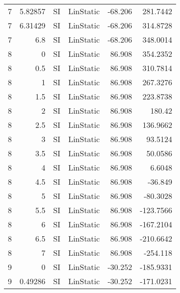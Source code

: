 \begin{table}[H]
{\begin{tabular}{rrrlrr}
    \multicolumn{1}{l}{7} & 5.82857 & \multicolumn{1}{l}{SI} & LinStatic & -68.206 & 281.7442 \\
    \multicolumn{1}{l}{7} & 6.31429 & \multicolumn{1}{l}{SI} & LinStatic & -68.206 & 314.8728 \\
    \multicolumn{1}{l}{7} & 6.8 & \multicolumn{1}{l}{SI} & LinStatic & -68.206 & 348.0014 \\
    \multicolumn{1}{l}{8} & 0   & \multicolumn{1}{l}{SI} & LinStatic & 86.908 & 354.2352 \\
    \multicolumn{1}{l}{8} & 0.5 & \multicolumn{1}{l}{SI} & LinStatic & 86.908 & 310.7814 \\
    \multicolumn{1}{l}{8} & 1   & \multicolumn{1}{l}{SI} & LinStatic & 86.908 & 267.3276 \\
    \multicolumn{1}{l}{8} & 1.5 & \multicolumn{1}{l}{SI} & LinStatic & 86.908 & 223.8738 \\
    \multicolumn{1}{l}{8} & 2   & \multicolumn{1}{l}{SI} & LinStatic & 86.908 & 180.42 \\
    \multicolumn{1}{l}{8} & 2.5 & \multicolumn{1}{l}{SI} & LinStatic & 86.908 & 136.9662 \\
    \multicolumn{1}{l}{8} & 3   & \multicolumn{1}{l}{SI} & LinStatic & 86.908 & 93.5124 \\
    \multicolumn{1}{l}{8} & 3.5 & \multicolumn{1}{l}{SI} & LinStatic & 86.908 & 50.0586 \\
    \multicolumn{1}{l}{8} & 4   & \multicolumn{1}{l}{SI} & LinStatic & 86.908 & 6.6048 \\
    \multicolumn{1}{l}{8} & 4.5 & \multicolumn{1}{l}{SI} & LinStatic & 86.908 & -36.849 \\
    \multicolumn{1}{l}{8} & 5   & \multicolumn{1}{l}{SI} & LinStatic & 86.908 & -80.3028 \\
    \multicolumn{1}{l}{8} & 5.5 & \multicolumn{1}{l}{SI} & LinStatic & 86.908 & -123.7566 \\
    \multicolumn{1}{l}{8} & 6   & \multicolumn{1}{l}{SI} & LinStatic & 86.908 & -167.2104 \\
    \multicolumn{1}{l}{8} & 6.5 & \multicolumn{1}{l}{SI} & LinStatic & 86.908 & -210.6642 \\
    \multicolumn{1}{l}{8} & 7   & \multicolumn{1}{l}{SI} & LinStatic & 86.908 & -254.118 \\
    \multicolumn{1}{l}{9} & 0   & \multicolumn{1}{l}{SI} & LinStatic & -30.252 & -185.9331 \\
    \multicolumn{1}{l}{9} & 0.49286 & \multicolumn{1}{l}{SI} & LinStatic & -30.252 & -171.0231 \\

\end{tabular}}
\end{table}
